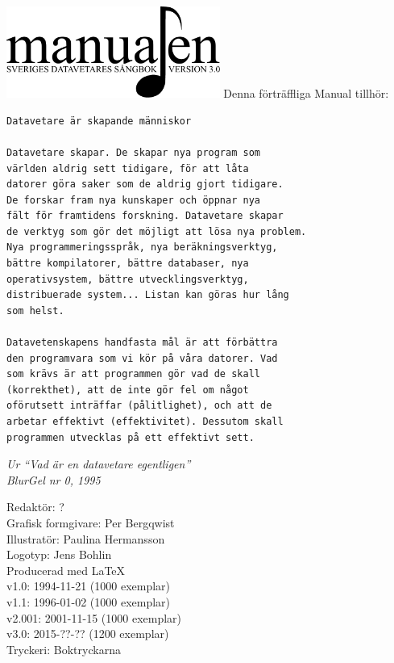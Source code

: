 \documentclass[a6paper,fontsize=10pt,twoside,open=right]{scrbook}
\begin{document}
\setlength{\parindent}{0pt}
\vspace*{6.5cm}
\hspace*{0.9cm}
\includegraphics[keepaspectratio,width=7cm]{elements/logo.pdf}
\clearpage
\noindent Denna förträffliga Manual tillhör:
\ohead{\textnormal{\textsc{\scriptsize\leftmark}}}
\ofoot[\pagemark]{\textsc{\scriptsize\pagemark}}
\clearpage
{\small\begin{verbatim}
Datavetare är skapande människor

Datavetare skapar. De skapar nya program som
världen aldrig sett tidigare, för att låta
datorer göra saker som de aldrig gjort tidigare.
De forskar fram nya kunskaper och öppnar nya
fält för framtidens forskning. Datavetare skapar
de verktyg som gör det möjligt att lösa nya problem.
Nya programmeringsspråk, nya beräkningsverktyg,
bättre kompilatorer, bättre databaser, nya
operativsystem, bättre utvecklingsverktyg,
distribuerade system... Listan kan göras hur lång
som helst.
  
Datavetenskapens handfasta mål är att förbättra
den programvara som vi kör på våra datorer. Vad
som krävs är att programmen gör vad de skall
(korrekthet), att de inte gör fel om något
oförutsett inträffar (pålitlighet), och att de
arbetar effektivt (effektivitet). Dessutom skall
programmen utvecklas på ett effektivt sett.
\end{verbatim}}
\vspace{10pt}
{\footnotesize\textit{Ur ``Vad är en datavetare
egentligen''\\ BlurGel nr 0, 1995}}
\clearpage
\setlength{\parindent}{15pt}
\null
\vfill
    {\noindent\small\centering
      Redaktör: ?\\
      Grafisk formgivare: Per Bergqwist\\
      Illustratör: Paulina Hermansson\\
      Logotyp: Jens Bohlin\\
      Producerad med \LaTeX\\
      v1.0: 1994-11-21 (1000 exemplar)\\
      v1.1: 1996-01-02 (1000 exemplar)\\
      v2.001: 2001-11-15 (1000 exemplar)\\
      v3.0: 2015-??-?? (1200 exemplar)\\
      Tryckeri: Boktryckarna\par
    }
\cleardoublepage
\end{document}
